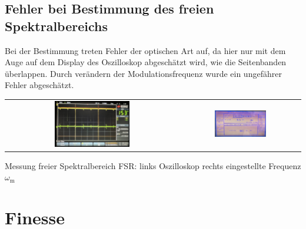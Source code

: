 \subsection*{Fehler bei Bestimmung des freien Spektralbereichs}

Bei der Bestimmung treten Fehler der optischen Art auf, da hier nur mit dem Auge auf dem Display des Oszilloskop abgeschätzt wird, wie die Seitenbanden überlappen. Durch verändern der Modulationsfrequenz wurde ein ungefährer Fehler abgeschätzt.

\begin{center}
    \captionsetup{type=figure}
    \begin{tabular}{c c}
        \includegraphics[width=0.45\textwidth]{Bilder/FSR/fsr_oszi.jpg} & \includegraphics[width=0.45\textwidth]{Bilder/FSR/fsr_hf-generator.jpg}
    \end{tabular}
    \caption{Messung freier Spektralbereich FSR: links Oszilloskop rechts eingestellte Frequenz  $\omega_\mathrm{m}$}
    \label{fig:specBereich}
\end{center}

\newpage
\section{Finesse}
\label{sec:finess}

